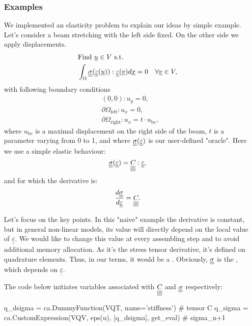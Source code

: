 \documentclass[12pt]{article}
\begin{document}
\subsubsection{Examples}

We implemented an elasticity problem to explain our ideas by simple example. Let's consider a beam stretching with the left side fixed. On the other side we apply displacements. 
\begin{align}
    & \text{Find } \underline{u} \in V \text{ s.t.} \\
    & \int_\Omega \underline{\underline{\sigma}}(\underline{\underline{\varepsilon}}(\underline{u})) : \underline{\underline{\varepsilon}}(\underline{v}) d\underline{x}  = 0 \quad \forall \underline{v} \in V,
\end{align}
with following boundary conditions
\begin{align}
    & (0, 0) : u_y = 0, \\
    & \partial\Omega_\text{left} : u_x = 0, \\
    & \partial\Omega_\text{right} : u_x = t \cdot u_\text{bc},
\end{align}
where $u_\text{bc}$ is a maximal displacement on the right side of the beam, $t$ is a parameter varying from 0 to 1, and where $\underline{\underline{\sigma}}(\underline{\underline{\varepsilon}})$ is our user-defined "oracle". Here we use a simple elastic behaviour:
\begin{equation}
    \underline{\underline{\sigma}}(\underline{\underline{\varepsilon}}) = \underline{\underline{\underline{\underline{C_{}}}}}:\underline{\underline{\varepsilon}},
\end{equation}
and for which the derivative is:
\begin{equation}
    \dfrac{d\underline{\underline{\sigma}}}{d\underline{\underline{\varepsilon}}} = \underline{\underline{\underline{\underline{C_{}}}}}.
\end{equation}

Let's focus on the key points. In this "naive" example the derivative is constant, but in general non-linear models, its value will directly depend on the local value of $\underline{\underline{\varepsilon}}$. We would like to change this value at every assembling step and to avoid additional memory allocation. As it's the stress tensor derivative, it's defined on quadrature elements. Thus, in our terms, it would be a . Obviously, $\underline{\underline{\sigma}}$ is the , which depends on $\underline{\underline{\varepsilon}}$. 

The code below initiates variables associated with $\underline{\underline{\underline{\underline{C_{}}}}}$ and $\underline{\underline{\sigma}}$ respectively:
\begin{pythoncode}
    q_dsigma = ca.DummyFunction(VQT, name='stiffness') # tensor C
    q_sigma = ca.CustomExpression(VQV, eps(u), [q_dsigma], get_eval)  # sigma_{n+1}
\end{pythoncode}
\end{document}
